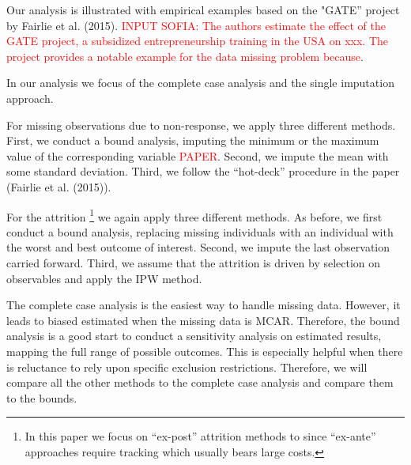 Our analysis is illustrated with empirical examples based on the "\ac{GATE}'' project by Fairlie et al. (2015). \textcolor{red}{INPUT SOFIA: The authors estimate the effect of the \ac{GATE} project, a subsidized entrepreneurship training in the USA on xxx. The project provides a notable example for the data missing problem because}.

In our analysis we focus of the complete case analysis and the single imputation approach.

For missing observations due to non-response, we apply three different methods. First, we conduct a bound analysis, imputing the minimum or the maximum value of the corresponding variable \textcolor{red}{PAPER}. Second, we impute the mean with some standard deviation.
Third, we follow the ``hot-deck'' procedure in the paper (Fairlie et al. (2015)).

For the attrition \footnote{In this paper we focus on ``ex-post'' attrition methods to  since ``ex-ante'' approaches require tracking which usually bears large costs.} we again apply three different methods. As before, we first conduct a bound analysis, replacing missing individuals with an individual with the worst and best outcome of interest. Second, we impute the last observation carried forward. Third, we assume that the attrition is driven by selection on observables and apply the \ac{IPW} method.

The complete case analysis is the easiest way to handle missing data. However, it leads to biased estimated when the missing data is \ac{MCAR}. Therefore, the bound analysis is a good start to conduct a sensitivity analysis on estimated results, mapping the full range of possible outcomes. This is especially helpful when there is reluctance to rely upon speciﬁc exclusion restrictions. Therefore, we will compare all the other methods to the complete case analysis and compare them to the bounds.

